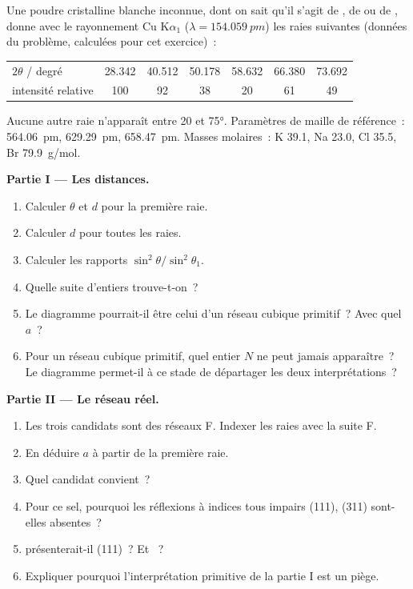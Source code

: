 \begin{problem}
\label{pb:b3:x-ray-diffraction:1}
Une poudre cristalline blanche inconnue, dont on sait qu'il s'agit de
, de  ou de ,
donne avec le rayonnement Cu K$\alpha_1$ ($\lambda = \qty{154.059}{pm}$)
les raies suivantes (données du problème, calculées pour cet exercice)~:
\begin{center}\small
\begin{tabular}{lcccccc}
\hline
$2\theta$ / degré & 28.342 & 40.512 & 50.178 & 58.632 & 66.380 & 73.692 \\
intensité relative & 100 & 92 & 38 & 20 & 61 & 49 \\ \hline
\end{tabular}
\end{center}
Aucune autre raie n'apparaît entre 20 et \ang{75}. Paramètres de maille
de référence~:
 \qty{564.06}{pm},  \qty{629.29}{pm},  \qty{658.47}{pm}. Masses
molaires~:
K 39.1, Na 23.0, Cl 35.5, Br \qty{79.9}{g/mol}.

\medskip\noindent\textbf{Partie I --- Les distances.}
\begin{enumerate}
  \item Calculer $\theta$ et $d$ pour la première raie.
  \item Calculer $d$ pour toutes les raies.
  \item Calculer les rapports $\sin^2\theta/\sin^2\theta_1$.
  \item Quelle suite d'entiers trouve-t-on~?
  \item Le diagramme pourrait-il être celui d'un réseau cubique
        primitif~? Avec quel $a$~?
  \item Pour un réseau cubique primitif, quel entier $N$ ne peut jamais
        apparaître~? Le diagramme permet-il à ce stade de départager les
        deux interprétations~?
\end{enumerate}

\medskip\noindent\textbf{Partie II --- Le réseau réel.}
\begin{enumerate}[resume]
  \item Les trois candidats sont des réseaux F. Indexer les raies avec la
        suite F.
  \item En déduire $a$ à partir de la première raie.
  \item Quel candidat convient~?
  \item Pour ce sel, pourquoi les réflexions à indices tous impairs (111),
        (311) sont-elles absentes~?
  \item {} présenterait-il (111)~? Et ~?
  \item Expliquer pourquoi l'interprétation primitive de la partie I est
        un piège.
\end{enumerate}


\end{problem}
